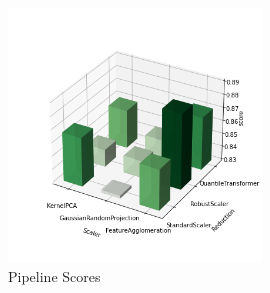\documentclass[letterpaper,11pt]{article}
\begin{document}
\begin{figure}[htb]
    \centering
    \includegraphics[width=0.6\textwidth]{Images/barGraph.png}
    \caption{Pipeline Scores}
    \label{fig:PipelinePerf}
\end{figure}
\end{document}
